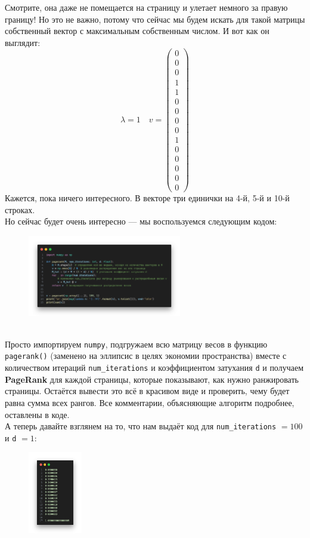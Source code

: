 \documentclass[a3paper,14pt]{extarticle}
\begin{document}
\pagebreak\noindent Смотрите, она даже не помещается на страницу и улетает немного за правую границу! Но это не важно, потому что сейчас мы будем искать для такой матрицы собственный вектор с максимальным собственным числом. И вот как он выглядит:
$$ \lambda = 1\quad v = \begin{pmatrix}
    0 \\ 0 \\ 0 \\ 1 \\ 1 \\ 0 \\ 0 \\ 0 \\ 0 \\ 1 \\ 0 \\ 0 \\ 0 \\ 0 \\ 0
\end{pmatrix}$$
Кажется, пока ничего интересного. В векторе три единички на 4-й, 5-й и 10-й строках. \\[1em] 
Но сейчас будет очень интересно --- мы воспользуемся следующим кодом:
\begin{figure}[h]
    \centering\includegraphics[width=0.6\textwidth]{2code.png}
\end{figure} \\
Просто импортируем \verb|numpy|, подгружаем всю матрицу весов в функцию \verb|pagerank()| (заменено на эллипсис в целях экономии пространства) вместе с количеством итераций \verb|num_iterations| и коэффициентом затухания \verb|d| и получаем \textbf{PageRank} для каждой страницы, которые показывают, как нужно ранжировать страницы. Остаётся вывести это всё в красивом виде и проверить, чему будет равна сумма всех рангов. Все комментарии, объясняющие алгоритм подробнее, оставлены в коде.\\[1em]
А теперь давайте взглянем на то, что нам выдаёт код для \verb|num_iterations| $= 100$ и \verb|d| $= 1$:
\begin{figure}[h]
    \centering\includegraphics[width=0.21\textwidth]{output(1).png}
\end{figure}
\end{document}
